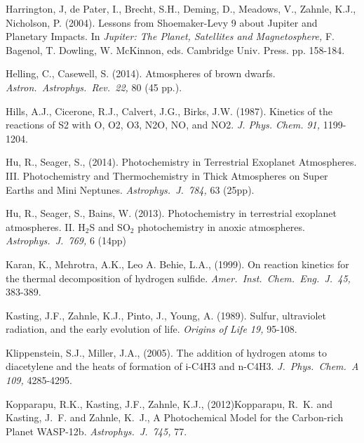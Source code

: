 \documentclass[preprint]{aastex}
\newcounter{reaction}
\begin{document}
\begin{thebibliography}{00}
Harrington, J, de Pater, I., Brecht, S.H., Deming, D., Meadows, V., Zahnle, K.J., Nicholson, P. (2004).
Lessons from Shoemaker-Levy 9 about Jupiter and Planetary Impacts.
In {\em Jupiter: The Planet, Satellites and Magnetosphere,} F. Bagenol, T. Dowling, W. McKinnon, eds.
Cambridge Univ. Press. pp. 158-184.

Helling, C., Casewell, S. (2014).
Atmospheres of brown dwarfs.
{\em Astron.\ Astrophys.\ Rev.\ 22,} 80 (45 pp.).

Hills, A.J., Cicerone, R.J., Calvert, J.G., Birks, J.W. (1987).
Kinetics of the reactions of S2 with O, O2, O3, N2O, NO, and NO2. 
{\em J. Phys. Chem. 91,} 1199-1204.

Hu, R., Seager, S., (2014).
Photochemistry in Terrestrial Exoplanet Atmospheres. III.
Photochemistry and Thermochemistry in Thick Atmospheres on Super Earths and Mini Neptunes.
{\em Astrophys.\ J.\  784,} 63 (25pp). 

Hu, R., Seager, S., Bains, W. (2013).
Photochemistry in terrestrial exoplanet atmospheres.
II. H$_2$S and SO$_2$ photochemistry in anoxic atmospheres.
{\em Astrophys.\ J.\  769,} 6 (14pp) 


Karan, K., Mehrotra, A.K., Leo A. Behie, L.A., (1999).
On reaction kinetics for the thermal decomposition of hydrogen sulfide.
{\em Amer.\ Inst.\ Chem.\ Eng.\ J.\ 45,} 383-389.

Kasting, J.F., Zahnle, K.J., Pinto, J., Young, A. (1989). 
Sulfur, ultraviolet radiation, and the early evolution of life.
{\em Origins of Life 19,} 95-108.

Klippenstein, S.J., Miller, J.A., (2005).
The addition of hydrogen atoms to diacetylene and the heats of formation of i-C4H3 and n-C4H3.
{\em J.\ Phys.\ Chem.\ A 109,} 4285-4295.

Kopparapu, R.K., Kasting, J.F., Zahnle, K.J., (2012){{Kopparapu}, R.~K. and {Kasting}, J.~F. and {Zahnle}, K.~J.},
A Photochemical Model for the Carbon-rich Planet WASP-12b.
{\em Astrophys.\ J.\  745,} 77. 


\end{thebibliography}
\end{document}
